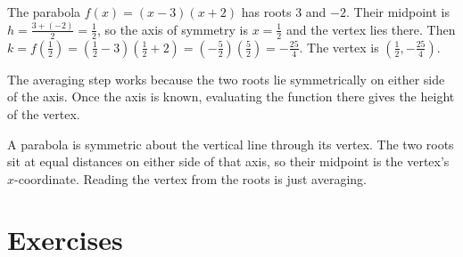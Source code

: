 \documentclass[12pt]{book}
\begin{document}
\begin{example}
The parabola $f(x)=(x-3)(x+2)$ has roots $3$ and $-2$. Their midpoint is
$h=\tfrac{3+(-2)}{2}=\tfrac12$, so the axis of symmetry is $x=\tfrac12$ and the
vertex lies there. Then $k=f\!\left(\tfrac12\right)=\left(\tfrac12-3\right)
\left(\tfrac12+2\right)=\left(-\tfrac52\right)\!\left(\tfrac52\right)=-\tfrac{25}{4}$.
The vertex is $\left(\tfrac12,-\tfrac{25}{4}\right)$.
\end{example}

The averaging step works because the two roots lie symmetrically on either side of
the axis. Once the axis is known, evaluating the function there gives the height of
the vertex.

\begin{visual}
A parabola is symmetric about the vertical line through its vertex. The two roots sit
at equal distances on either side of that axis, so their midpoint is the vertex's
$x$-coordinate. Reading the vertex from the roots is just averaging.
\end{visual}

\begin{center}
\end{center}

\section{Exercises}
\end{document}
